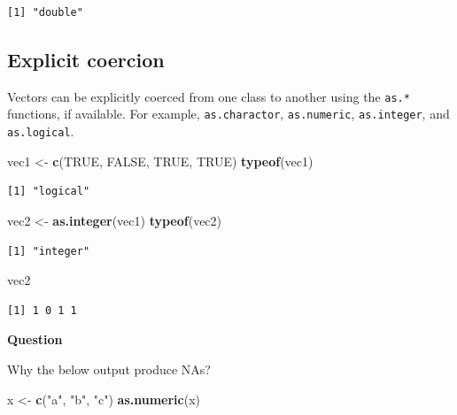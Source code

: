\documentclass[]{book}
\newenvironment{Shaded}{\begin{snugshade}}{\end{snugshade}}
\newcommand{\KeywordTok}[1]{\textcolor[rgb]{0.13,0.29,0.53}{\textbf{#1}}}
\newcommand{\NormalTok}[1]{#1}
\newcommand{\OtherTok}[1]{\textcolor[rgb]{0.56,0.35,0.01}{#1}}
\newcommand{\StringTok}[1]{\textcolor[rgb]{0.31,0.60,0.02}{#1}}
\begin{document}
\begin{verbatim}
[1] "double"
\end{verbatim}

\hypertarget{explicit-coercion}{%
\subsection{Explicit coercion}\label{explicit-coercion}}

Vectors can be explicitly coerced from one class to another using the \texttt{as.*} functions, if available. For example, \texttt{as.charactor}, \texttt{as.numeric}, \texttt{as.integer}, and \texttt{as.logical}.

\begin{Shaded}
\begin{Highlighting}[]
\NormalTok{vec1 <-}\StringTok{ }\KeywordTok{c}\NormalTok{(}\OtherTok{TRUE}\NormalTok{, }\OtherTok{FALSE}\NormalTok{, }\OtherTok{TRUE}\NormalTok{, }\OtherTok{TRUE}\NormalTok{)}
\KeywordTok{typeof}\NormalTok{(vec1)}
\end{Highlighting}
\end{Shaded}

\begin{verbatim}
[1] "logical"
\end{verbatim}

\begin{Shaded}
\begin{Highlighting}[]
\NormalTok{vec2 <-}\StringTok{ }\KeywordTok{as.integer}\NormalTok{(vec1)}
\KeywordTok{typeof}\NormalTok{(vec2)}
\end{Highlighting}
\end{Shaded}

\begin{verbatim}
[1] "integer"
\end{verbatim}

\begin{Shaded}
\begin{Highlighting}[]
\NormalTok{vec2}
\end{Highlighting}
\end{Shaded}

\begin{verbatim}
[1] 1 0 1 1
\end{verbatim}

\textbf{Question}

Why the below output produce NAs?

\begin{Shaded}
\begin{Highlighting}[]
\NormalTok{x <-}\StringTok{ }\KeywordTok{c}\NormalTok{(}\StringTok{"a"}\NormalTok{, }\StringTok{"b"}\NormalTok{, }\StringTok{"c"}\NormalTok{)}
\KeywordTok{as.numeric}\NormalTok{(x)}
\end{Highlighting}
\end{Shaded}
\end{document}

